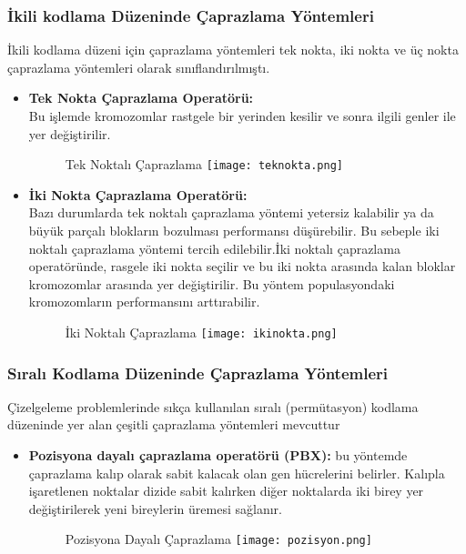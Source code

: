 \documentclass[12pt, a4paper]{article}
\begin{document}
\begin{flushleft}
	\subsubsection{İkili kodlama Düzeninde Çaprazlama Yöntemleri}
	İkili kodlama düzeni için çaprazlama yöntemleri tek nokta, iki nokta ve üç
	nokta çaprazlama yöntemleri olarak sınıflandırılmıştı.
	\begin{itemize}
		\item  \textbf {Tek Nokta Çaprazlama Operatörü:} \\
		Bu işlemde kromozomlar rastgele bir yerinden kesilir ve sonra ilgili genler ile yer değiştirilir.
		\begin{figure}[h]
			{ Tek Noktalı Çaprazlama} 
			\centering
			\texttt{[image: teknokta.png]}
			\\[20pt]
		\end{figure}\cite{birougul2005genetik}
		\clearpage
		\item  \textbf {İki Nokta Çaprazlama Operatörü:} \\
		Bazı durumlarda tek noktalı çaprazlama yöntemi yetersiz kalabilir ya da büyük parçalı blokların bozulması performansı düşürebilir. Bu sebeple iki noktalı çaprazlama yöntemi tercih edilebilir.İki noktalı çaprazlama operatöründe, rasgele iki nokta seçilir ve bu iki nokta arasında 
		kalan bloklar kromozomlar arasında yer değiştirilir. Bu yöntem populasyondaki kromozomların performansını arttırabilir.\cite{elen2011ccizelgeleme}
		\begin{figure}[h]
			{ İki Noktalı Çaprazlama}
			\centering
			\texttt{[image: ikinokta.png]}
			\\[20pt]
		\end{figure}
		
	\end{itemize}
	
	\subsubsection{Sıralı Kodlama Düzeninde Çaprazlama Yöntemleri}
	Çizelgeleme problemlerinde sıkça kullanılan sıralı (permütasyon) kodlama 
	düzeninde yer alan çeşitli çaprazlama yöntemleri mevcuttur\clearpage
	\begin{itemize}
		\item \textbf{ Pozisyona dayalı çaprazlama operatörü (PBX):}
		bu yöntemde 
		çaprazlama kalıp olarak sabit kalacak olan gen hücrelerini belirler. Kalıpla 
		işaretlenen noktalar dizide sabit kalırken diğer noktalarda iki birey yer değiştirilerek 
		yeni bireylerin üremesi sağlanır.\cite{aydemir2009atolye}
		\begin{figure}[h]
			{ Pozisyona Dayalı Çaprazlama} 
			\centering
			\texttt{[image: pozisyon.png]}
			

\end{figure}
\end{itemize}
\end{flushleft}
\end{document}
